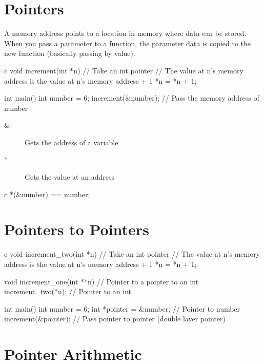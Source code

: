 \section{Pointers}\label{sec:c_pointers}

A memory address points to a location in memory where data can be stored.
When you pass a parameter to a function, the parameter data is copied to the new function (basically passing by value).

\begin{code}{c}
    void increment(int *n) { // Take an int pointer
        // The value at n's memory address is the value at n's memory address + 1
        *n = *n + 1;
    }

    int main() {
        int number = 6;
        increment(&number); // Pass the memory address of number
    }
\end{code}
\begin{note}
    \begin{description}
        \item[\&] Gets the address of a variable
        \item[*] Gets the value at an address
    \end{description}
    \begin{code}{c}
        *(&number) == number;
    \end{code}
\end{note}

\section{Pointers to Pointers}\label{sec:pointers_to_pointers}

\begin{code}{c}
    void increment_two(int *n) { // Take an int pointer
        // The value at n's memory address is the value at n's memory address + 1
        *n = *n + 1;
    }

    void increment_one(int **n) { // Pointer to a pointer to an int
        increment_two(*n); // Pointer to an int
    }

    int main() {
        int number = 6;
        int *pointer = &number; // Pointer to number
        increment(&pointer); // Pass pointer to pointer (double layer pointer)
    }
\end{code}

\section{Pointer Arithmetic}\label{sec:pointer_arithmetic}

